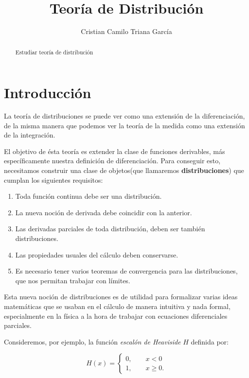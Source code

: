 \documentclass[letter,12pt]{article}
\title{Teoría de Distribución}
\author{Cristian Camilo Triana García}
\begin{document}
\maketitle

\begin{abstract}\normalsize
Estudiar teoría de distribución
\end{abstract}




\section{Introducción}
La teoría de distribuciones se puede ver como una extensión de la diferenciación,
de la misma manera que podemos ver la teoría de la medida como una extensión de la
integración.

El objetivo de ésta teoría es extender la clase de funciones derivables, más específicamente
nuestra definición de diferenciación. Para conseguir esto, necesitamos construir
una clase de objetos(que llamaremos \textbf{distribuciones}) que cumplan los siguientes requisitos:

\begin{enumerate}
	\item Toda función continua debe ser una distribución.
	\item La nueva noción de derivada debe coincidir con la anterior.
	\item Las derivadas parciales de toda distribución, deben ser también distribuciones.
	\item Las propiedades usuales del cálculo deben conservarse.
	\item Es necesario tener varios teoremas de convergencia para las distribuciones,
		que nos permitan trabajar con límites.
\end{enumerate}

Esta nueva noción de distribuciones es de utilidad para formalizar varias ideas matemáticas que se usaban en el cálculo de manera intuitiva y nada formal, especialmente en la física a la hora de trabajar con ecuaciones diferenciales parciales. 

Consideremos, por ejemplo, la función \textit{escalón de Heaviside} $ H $ definida por:

\begin{equation}
	H(x) = 
	\begin{cases}
		0, \qquad x < 0 \\
		1, \qquad x \ge 0. 
	\end{cases}
\end{equation}
\end{document}
